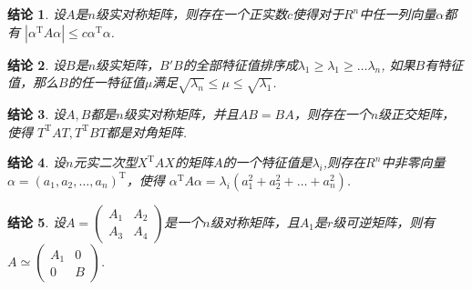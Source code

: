 \documentclass[UTF8]{article}
\newtheorem{ccl}{结论}[subsection]
\begin{document}
\begin{ccl}
  设$A$是$n$级实对称矩阵，则存在一个正实数$c$使得对于$R^n$中任一列向量$\alpha$都有
  $|\alpha^{\mathrm{T}}A\alpha|\le c\alpha^{\mathrm{T}}\alpha$.
\end{ccl}
\begin{ccl}
  设$B$是$n$级实矩阵，$B'B$的全部特征值排序成$\lambda_1\ge \lambda_1 \ge \ldots \lambda_n$,
  如果$B$有特征值，那么$B$的任一特征值$\mu$满足$\sqrt{\lambda_n}\le \mu \le \sqrt{\lambda_1}$.
\end{ccl}
\begin{ccl}
  设$A,B$都是$n$级实对称矩阵，并且$AB=BA$，则存在一个$n$级正交矩阵，使得
  $T^{\mathrm{T}}AT,T^{\mathrm{T}}BT$都是对角矩阵.
\end{ccl}
\begin{ccl}
  设$n$元实二次型$X^{\mathrm{T}}AX$的矩阵$A$的一个特征值是$\lambda_i$,则存在$R^n$中非零向量
  $\alpha=(a_1,a_2,\ldots,a_n)^{\mathrm{T}}$，使得
  $\alpha^{\mathrm{T}}A\alpha=\lambda_i(a_1^2+a_2^2+\ldots+a_n^2)$.
\end{ccl}
\begin{ccl}
  设$A=\begin{pmatrix} A_1&A_2\\A_3&A_4 \end{pmatrix}$是一个$n$级对称矩阵，且$A_1$是$r$级可逆矩阵，则有
  $A\simeq \begin{pmatrix} A_1&0\\0&B \end{pmatrix}$.
\end{ccl}
\end{document}
